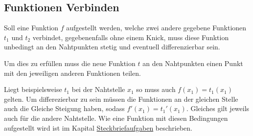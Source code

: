 \documentclass{article}
\begin{document}
\subsection{Funktionen Verbinden}
\begin{minipage}{\dimexpr\linewidth-4cm}
 Soll eine Funktion $f$ aufgestellt werden, welche zwei andere gegebene Funktionen $t_1$ und $t_2$ verbindet, gegebenenfalls ohne einem Knick, muss diese Funktion unbedingt an den Nahtpunkten stetig und eventuell differenzierbar sein.
 
 Um dies zu erfüllen muss die neue Funktion $t$ an den Nahtpunkten einen Punkt mit den jeweiligen anderen Funktionen teilen. 
\end{minipage}
\hfill
\begin{minipage}{4cm}
 \center
\end{minipage} 
Liegt beispielsweise $t_1$ bei der Nahtstelle $x_1$ so muss auch $f(x_1)=t_1(x_1)$ gelten. 
Um differezierbar zu sein müssen die Funktionen an der gleichen Stelle auch die Gleiche Steigung haben, sodass $f'(x_1)=t_1'(x_1)$. Gleiches gilt jeweils auch für die andere Nahtstelle.
Wie eine Funktion mit diesen Bedingungen aufgestellt wird ist im Kapital \hyperref[Steckbriefaufgaben]{Steckbriefaufgaben} beschrieben.
\end{document}
